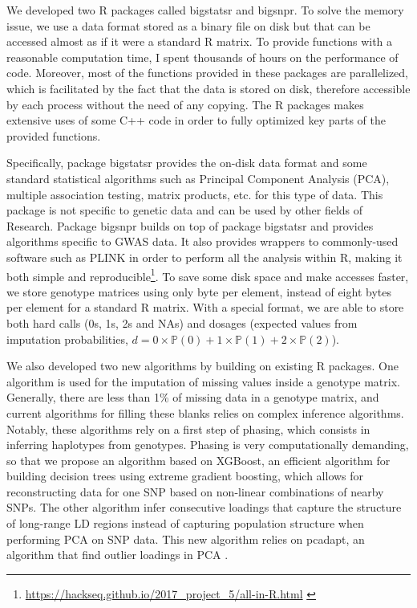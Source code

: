 We developed two R packages called bigstatsr and bigsnpr. 
To solve the memory issue, we use a data format stored as a binary file on disk but that can be accessed almost as if it were a standard R matrix. 
To provide functions with a reasonable computation time, I spent thousands of hours on the performance of code. Moreover, most of the functions provided in these packages are parallelized, which is facilitated by the fact that the data is stored on disk, therefore accessible by each process without the need of any copying.
The R packages makes extensive uses of some C++ code in order to fully optimized key parts of the provided functions.

Specifically, package bigstatsr provides the on-disk data format and some standard statistical algorithms such as Principal Component Analysis (PCA), multiple association testing, matrix products, etc. for this type of data. 
This package is not specific to genetic data and can be used by other fields of Research.
Package bigsnpr builds on top of package bigstatsr and provides algorithms specific to GWAS data. It also provides wrappers to commonly-used software such as PLINK in order to perform all the analysis within R, making it both simple and reproducible\footnote{\url{https://hackseq.github.io/2017\_project\_5/all-in-R.html} \cite[]{grande2018hackathon}}.
To save some disk space and make accesses faster, we store genotype matrices using only  
byte per element, instead of eight bytes per element for a standard R matrix. With a special format, we are able to store both hard calls (0s, 1s, 2s and NAs) and dosages (expected values from imputation probabilities, $d = 0 \times \mathbb{P}(0) + 1 \times \mathbb{P}(1) + 2 \times \mathbb{P}(2)$).

We also developed two new algorithms by building on existing R packages.
One algorithm is used for the imputation of missing values inside a genotype matrix. Generally, there are less than 1\% of missing data in a genotype matrix, and current algorithms for filling these blanks relies on complex inference algorithms. 
Notably, these algorithms rely on a first step of phasing, which consists in inferring haplotypes from genotypes. Phasing is very computationally demanding, so that we propose an algorithm based on XGBoost, an efficient algorithm for building decision trees using extreme gradient boosting, which allows for reconstructing data for one SNP based on non-linear combinations of nearby SNPs.
The other algorithm infer consecutive loadings that capture the structure of long-range LD regions instead of capturing population structure when performing PCA on SNP data.
This new algorithm relies on pcadapt, an algorithm that find outlier loadings in PCA \cite[]{luu2017pcadapt}. 

